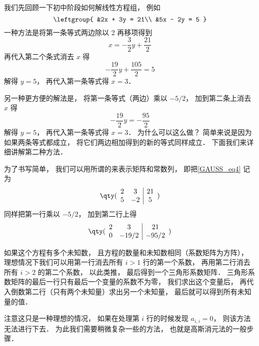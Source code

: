 \begin{exam}{}\label{GAUSS_ex1}
我们先回顾一下初中阶段如何解线性方程组， 例如
\begin{equation}\label{GAUSS_eq4}
\leftgroup{
&2x + 3y = 21\\
&5x - 2y = 5
}\end{equation}
一种方法是将第一条等式两边除以 2 再移项得到
\begin{equation} %
x = - \frac32 y + \frac{21}{2}
\end{equation}
再代入第二个条式消去 $x$ 得
\begin{equation} %
-\frac{19}{2} y + \frac{105}{2} = 5
\end{equation}
解得 $y = 5$， 再代入第一条等式得 $x = 3$．

另一种更方便的解法是， 将第一条等式（两边）乘以 $-5/2$， 加到第二条上消去 $x$ 得
\begin{equation} %
-\frac{19}{2} y = -\frac{95}{2}
\end{equation}
解得 $y = 5$， 再代入第一条等式得 $x = 3$． 为什么可以这么做？  简单来说是因为如果两条等式都成立， 将它们两边相加得到的新的等式同样成立． 下面我们来详细讲解第二种方法．

为了书写简单， 我们可以用所谓的来表示矩阵和常数列， 即把\autoref{GAUSS_eq4} 记为
\begin{equation}  %
\qty( \begin{array}{cc|c}
	2 & 3 & 21 \\
	5 & -2 & 5
	\end{array} 
)\end{equation}
同样把第一行乘以 $-5/2$， 加到第二行上得
\begin{equation} %
\qty( \begin{array}{cc|c}
	2 & 3 & 21 \\
	0 & -19/2 & -95/2
	\end{array} 
)\end{equation}

如果这个方程有多个未知数， 且方程的数量和未知数相同（系数矩阵为方阵）， 理想情况下我们可以用第一行消去所有 $i > 1$ 行的第一个系数， 再用第二行消去所有 $i > 2$ 的第二个系数， 以此类推， 最后得到一个三角形系数矩阵． 三角形系数矩阵的最后一行只有最后一个变量的系数不为零， 我们求出这个变量后， 再代入倒数第二行（只有两个未知量）求出另一个未知量， 最后就可以得到所有未知量的值．

注意这只是一种理想的情况， 如果在处理第 $i$ 行的时候发现 $a_{i,i} = 0$， 则该方法无法进行下去． 为此我们需要稍微复杂一些的方法， 也就是高斯消元法的一般步骤．
\end{exam}

